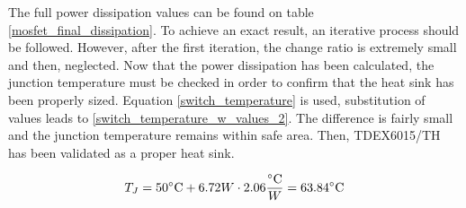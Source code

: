 The full power dissipation values can be found on table \ref{mosfet_final_dissipation}. To achieve an exact result, an iterative process should be followed. However, after the first iteration, the change ratio is extremely small and then, neglected. Now that the power dissipation has been calculated, the junction temperature must be checked in order to confirm that the heat sink has been properly sized. Equation \ref{switch_temperature} is used, substitution of values leads to \ref{switch_temperature_w_values_2}. The difference is fairly small and the junction temperature remains within safe area. Then, TDEX6015/TH has been validated as a proper heat sink.

\begin{equation} \label{switch_temperature_w_values_2}
T_{J} = 50 \decC + 6.72 W \cdot  2.06 \frac{\decC}{W} = 63.84 \decC
\end{equation}